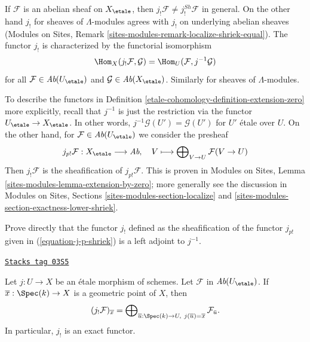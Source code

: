 If $\mathcal{F}$ is an abelian sheaf on $X_\etale$, then
$j_!\mathcal{F} \not = j_!^{Sh}\mathcal{F}$ in general. On the other hand
$j_!$ for sheaves of $\Lambda$-modules agrees with $j_!$ on underlying
abelian sheaves
(Modules on Sites, Remark \ref{sites-modules-remark-localize-shriek-equal}).
The functor $j_!$ is characterized by the functorial isomorphism
$$
\Hom_X(j_!\mathcal{F}, \mathcal{G}) = \Hom_U(\mathcal{F}, j^{-1}\mathcal{G})
$$
for all $\mathcal{F} \in \textit{Ab}(U_\etale)$ and
$\mathcal{G} \in \textit{Ab}(X_\etale)$. Similarly for
sheaves of $\Lambda$-modules.

\medskip\noindent
To describe the functors in Definition \ref{etale-cohomology-definition-extension-zero}
more explicitly, recall that $j^{-1}$ is just the restriction
via the functor $U_\etale \to X_\etale$. In other words,
$j^{-1}\mathcal{G}(U') = \mathcal{G}(U')$ for $U'$ \'etale over $U$.
On the other hand, for $\mathcal{F} \in \textit{Ab}(U_\etale)$
we consider the presheaf
\begin{equation}
\label{equation-j-p-shriek}
j_{p!}\mathcal{F} : X_\etale \longrightarrow \textit{Ab},
\quad
V \longmapsto \bigoplus\nolimits_{V \to U} \mathcal{F}(V \to U)
\end{equation}
Then $j_!\mathcal{F}$ is the sheafification of $j_{p!}\mathcal{F}$.
This is proven in Modules on Sites, Lemma
\ref{sites-modules-lemma-extension-by-zero};
more generally see the discussion in
Modules on Sites, Sections \ref{sites-modules-section-localize} and
\ref{sites-modules-section-exactness-lower-shriek}.

\begin{exercise}
\label{exercise-jshriek-direct}
Prove directly that the functor $j_!$ defined as the sheafification of
the functor $j_{p!}$ given in
(\ref{equation-j-p-shriek}) is a left adjoint to $j^{-1}$.
\end{exercise}

\begin{proposition}
\label{etale-cohomology-proposition-describe-jshriek}
\href{https://stacks.math.columbia.edu/tag/03S5}{\texttt{Stacks tag 03S5}}

Let $j : U \to X$ be an \'etale morphism of schemes.
Let $\mathcal{F}$ in $\textit{Ab}(U_\etale)$.
If $\overline{x} : \Spec(k) \to X$ is a geometric point of $X$, then
$$
(j_!\mathcal{F})_{\overline{x}} =
\bigoplus\nolimits_{\overline{u} : \Spec(k) \to U,\ j(\overline{u}) =
\overline{x}} \mathcal{F}_{\bar{u}}.
$$
In particular, $j_!$ is an exact functor.
\end{proposition}

